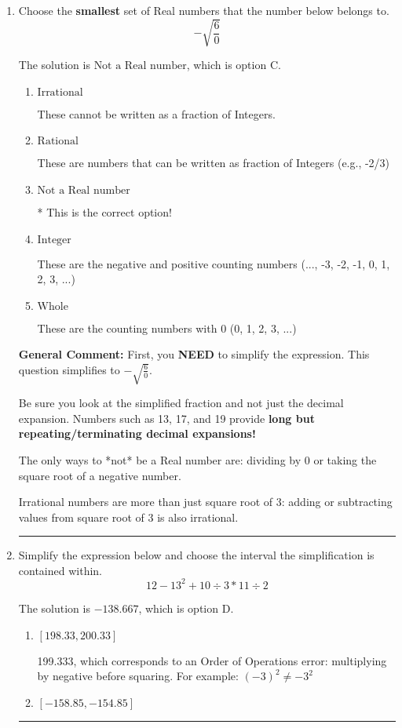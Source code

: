 \documentclass{extbook}[14pt]
\newcommand{\litem}[1]{\item #1

\rule{\textwidth}{0.4pt}}
\begin{document}
\begin{enumerate}\litem{
Choose the \textbf{smallest} set of Real numbers that the number below belongs to.
\[ -\sqrt{\frac{6}{0}} \]

The solution is \( \text{Not a Real number} \), which is option C.\begin{enumerate}[label=\Alph*.]
\item \( \text{Irrational} \)

These cannot be written as a fraction of Integers.
\item \( \text{Rational} \)

These are numbers that can be written as fraction of Integers (e.g., -2/3)
\item \( \text{Not a Real number} \)

* This is the correct option!
\item \( \text{Integer} \)

These are the negative and positive counting numbers (..., -3, -2, -1, 0, 1, 2, 3, ...)
\item \( \text{Whole} \)

These are the counting numbers with 0 (0, 1, 2, 3, ...)
\end{enumerate}

\textbf{General Comment:} First, you \textbf{NEED} to simplify the expression. This question simplifies to $-\sqrt{\frac{6}{0}}$. 
 
 Be sure you look at the simplified fraction and not just the decimal expansion. Numbers such as 13, 17, and 19 provide \textbf{long but repeating/terminating decimal expansions!} 
 
 The only ways to *not* be a Real number are: dividing by 0 or taking the square root of a negative number. 
 
 Irrational numbers are more than just square root of 3: adding or subtracting values from square root of 3 is also irrational.
}
\litem{
Simplify the expression below and choose the interval the simplification is contained within.
\[ 12 - 13^2 + 10 \div 3 * 11 \div 2 \]

The solution is \( -138.667 \), which is option D.\begin{enumerate}[label=\Alph*.]
\item \( [198.33, 200.33] \)

 199.333, which corresponds to an Order of Operations error: multiplying by negative before squaring. For example: $(-3)^2 \neq -3^2$
\item \( [-158.85, -154.85] \)


\end{enumerate}}
\end{enumerate}
\end{document}
